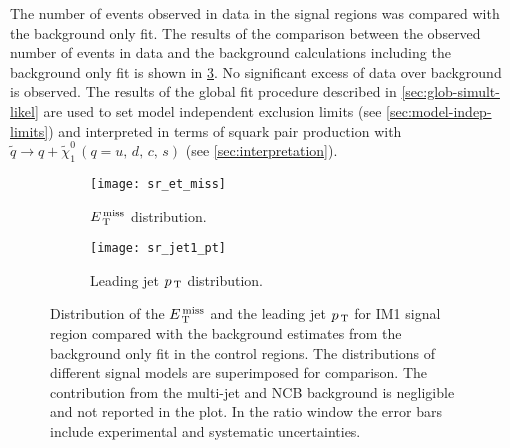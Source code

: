 The number of events observed in data in the signal regions was compared with
the background only fit. The results of the comparison between the observed
number of events in data and the background calculations including the
background only fit is shown in
\cref{fig:sr_plots}.
No significant excess of data over background is observed. The results of the
global fit procedure described in \cref{sec:glob-simult-likel} are used to set
model independent exclusion limits (see \cref{sec:model-indep-limits}) and
interpreted in terms of squark pair production with
$\widetilde{q} \rightarrow q + \widetilde{\chi}_1^0\, (q = u,\, d,\, c,\, s)$
(see \cref{sec:interpretation}).
\begin{figure}[!htb]
  \centering
  \begin{subfigure}[t]{.48\linewidth}
    \texttt{[image: sr\_et\_miss]}
    \caption{$E_\mathrm{\, T}^\mathrm{\, miss}$ distribution.}
    \label{fig:sr_et_miss}
  \end{subfigure}
  \begin{subfigure}[t]{.48\linewidth}
    \texttt{[image: sr\_jet1\_pt]}
    \caption{Leading jet $p_\mathrm{\, T}$ distribution.}
    \label{fig:sr_jet1_pt}
  \end{subfigure}
  \caption{Distribution of the $E_\mathrm{\, T}^\mathrm{\, miss}$ and the leading jet $p_\mathrm{\, T}$ for IM1 signal
    region compared with the background estimates from the background only fit
    in the control regions. The distributions of different signal models are
    superimposed for comparison. The contribution from the multi-jet and NCB
    background is negligible and not reported in the plot. In the ratio window
    the error bars include experimental and systematic uncertainties.}
  \label{fig:sr_plots}
\end{figure}
